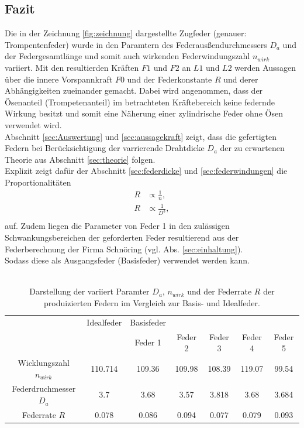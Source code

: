 \subsection{Fazit}
Die in der Zeichnung \ref{fig:zeichnung} dargestellte Zugfeder (genauer: Trompentenfeder)
wurde in den Paramtern des Federausßendurchmessers $D_a$ und der Federgesamtlänge und somit auch
wirkenden Federwindungszahl $n_{wirk}$ variiert. Mit den resultierden Kräften $F1$ und $F2$ an
$L1$ und $L2$ werden Aussagen über die innere Vorspannkraft $F0$ und der Federkonstante $R$ und derer
Abhängigkeiten zueinander gemacht. Dabei wird angenommen, dass der Ösenanteil (Trompetenanteil) 
im betrachteten Kräftebereich keine federnde Wirkung besitzt und somit eine Näherung einer
zylindrische Feder ohne Ösen verwendet wird.\\

Abschnitt \ref{sec:Auswertung} und \ref{sec:aussagekraft} zeigt, dass die gefertigten Federn 
bei Berücksichtigung der varrierende Drahtdicke $D_a$ der zu erwartenen 
Theorie aus Abschnitt \ref{sec:theorie} folgen.\\

Explizit zeigt dafür der Abschnitt \ref{sec:federdicke} und \ref{sec:federwindungen} die Proportionalitäten 
\begin{align*}
    R &\propto \frac{1}{n},\\
    R &\propto \frac{1}{D^3},\\
\end{align*}
auf.
Zudem liegen die Parameter von Feder 1 in den zulässigen Schwankungsbereichen 
der geforderten Feder resultierend aus der Federberechnung der Firma Schnöring (vgl. Abs. \ref{sec:einhaltung}).\\ 
Sodass diese als Ausgangsfeder (Basisfeder) verwendet werden kann.\\\\

\begin{table}
    \centering
    \begin{tabular}{c |c c c c c c}
        \toprule
        &Idealfeder& Basisfeder&&&&\\
        && Feder 1 & Feder 2 & Feder 3 & Feder 4 & Feder 5\\
        \midrule
        Wicklungszahl $n_{wirk}$&110.714& 109.36 & 109.98 & 108.39 & 119.07 & 99.54\\ 
        Federdruchmesser $D_a$&3.7&3.68 & 3.57 & 3.818 & 3.68 & 3.684\\
        Federrate $R$ &0.078& 0.086 & 0.094 & 0.077 & 0.079 & 0.093\\
        \bottomrule
    \end{tabular}
    \caption{Darstellung der variiert Paramter $D_a$, $n_{wirk}$ und der Federrate $R$ der produizierten Federn im Vergleich zur
    Basis- und Idealfeder.}
\end{table}



